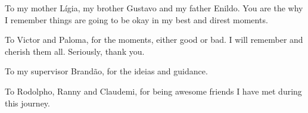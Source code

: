 \documentclass[pretext-section.tex]{subfiles}
\begin{document}
\begin{agradecimentos}
    To my mother Lígia, my brother Gustavo and my father Enildo. You are the 
    why I remember things are going to be okay in my best and direst moments.

    To Victor and Paloma, for the moments, either good or bad. I will remember 
    and cherish them all. Seriously, thank you.

    To my supervisor Brandão, for the ideias and guidance.

    To Rodolpho, Ranny and Claudemi, for being awesome friends I have met 
    during this journey.
    
\end{agradecimentos}
\end{document}
